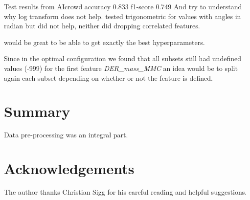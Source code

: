\documentclass[10pt,conference,compsocconf]{IEEEtran}
\begin{document}
Test results from AIcrowd accuracy 0.833 f1-score 0.749	
And try to understand why log transform does not help. tested trigonometric 
for values with angles in radian but did not help, neither did dropping correlated features.

would be great to be able to get exactly the best hyperparameters. 

Since in the optimal configuration we found that all subsets still had undefined values (-999) for the first feature \textit{DER\_mass\_MMC} an idea would be to split again each subset
depending on whether or not the feature is defined.

\section{Summary}

Data pre-processing was an integral part. 

\section*{Acknowledgements}
The author thanks Christian Sigg for his careful reading and helpful
suggestions.




\end{document}
